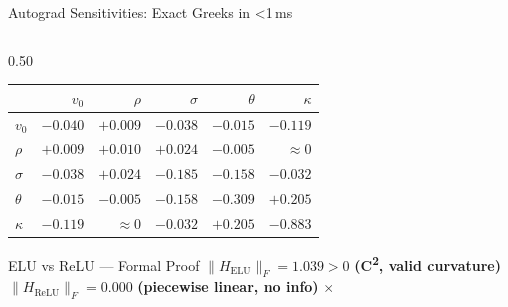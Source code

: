 \documentclass[aspectratio=169, 10pt]{beamer}
\begin{document}
\begin{frame}{Autograd Sensitivities: Exact Greeks in \textless1\,ms}
\begin{columns}[T]
\begin{column}{0.50\textwidth}
      \vspace{0.3em}
      \begin{center}
      \setlength{\tabcolsep}{3pt}
      \scriptsize
      \begin{tabular}{@{}lrrrrr@{}}
        \toprule
          & $v_0$ & $\rho$ & $\sigma$ & $\theta$ & $\kappa$ \\ \midrule
        $v_0$    & $-0.040$ & $+0.009$ & $-0.038$ & $-0.015$ & $-0.119$ \\
        $\rho$   & $+0.009$ & $+0.010$ & $+0.024$ & $-0.005$ & $\approx0$ \\
        $\sigma$ & $-0.038$ & $+0.024$ & $-0.185$ & $-0.158$ & $-0.032$ \\
        $\theta$ & $-0.015$ & $-0.005$ & $-0.158$ & $-0.309$ & $+0.205$ \\
        $\kappa$ & $-0.119$ & $\approx0$ & $-0.032$ & $+0.205$ & $-0.883$ \\
        \bottomrule
      \end{tabular}
      \end{center}
      \vspace{0.3em}
      \begin{exampleblock}{ELU vs ReLU — Formal Proof}
        \small
        $\|H_\mathrm{ELU}\|_F = 1.039 > 0$
        \;\;\textbf{(C\textsuperscript{2}, valid curvature)} \checkmark\\
        $\|H_\mathrm{ReLU}\|_F = 0.000$
        \;\;\textbf{(piecewise linear, no info)} $\times$
      \end{exampleblock}
    \end{column}
  \end{columns}
\end{frame}
\end{document}
